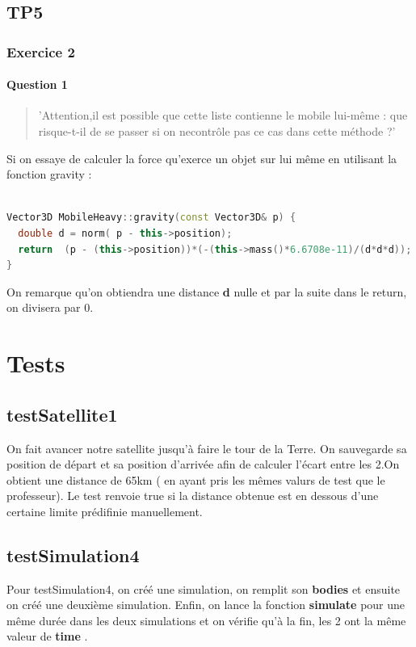 \documentclass{article}
\begin{document}
    \subsection{TP5}
        \subsubsection{Exercice 2}
            \paragraph{Question 1}
                \begin{quotation}
                'Attention,il est possible que cette liste contienne le mobile
                  lui-même : que risque-t-il de se passer si on necontrôle pas
                  ce cas dans cette méthode ?'
                \end{quotation}
                Si on essaye de calculer la force qu'exerce un objet sur lui
                même en utilisant la fonction gravity : 
                \\
                \begin{lstlisting}[language=C++]

Vector3D MobileHeavy::gravity(const Vector3D& p) {
  double d = norm( p - this->position);
  return  (p - (this->position))*(-(this->mass()*6.6708e-11)/(d*d*d));
}

                \end{lstlisting}
                On remarque qu'on obtiendra une distance \textbf{d} nulle et
                par la suite dans le return, on divisera par 0.

\section{Tests} 
\subsection{testSatellite1}
On fait avancer notre satellite jusqu'à faire le tour de la Terre. On
sauvegarde sa position de départ et sa position d'arrivée afin de calculer
l'écart entre les 2.On obtient une distance de 65km ( en ayant pris les mêmes
valurs de test que le professeur). Le test renvoie true si la distance obtenue
est en dessous d'une certaine limite prédifinie manuellement.
\subsection{testSimulation4}
Pour testSimulation4, on créé une simulation, on remplit son \textbf{bodies} et
ensuite on créé une deuxième simulation. Enfin, on lance la fonction
\textbf{simulate}  pour une même durée dans les deux simulations et on vérifie
qu'à la fin, les 2 ont la même valeur de \textbf{time} .
\end{document}
